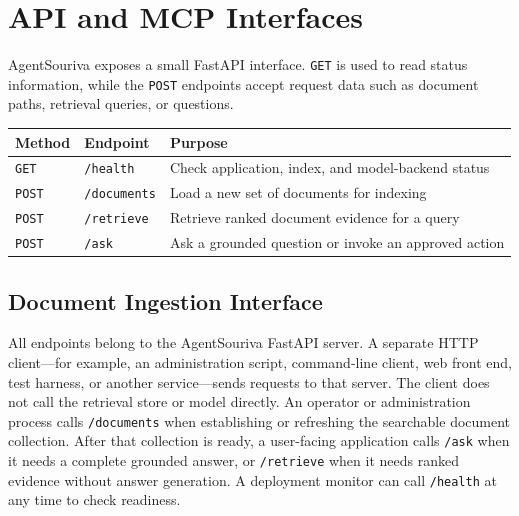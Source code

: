 
\section{API and MCP Interfaces}

AgentSouriva exposes a small FastAPI interface. \texttt{GET} is used to read status information, while the \texttt{POST} endpoints accept request data such as document paths, retrieval queries, or questions.

\begin{longtable}[]{@{}lll@{}}
\toprule\noalign{}
Method & Endpoint & Purpose \\
\midrule\noalign{}
\endhead
\bottomrule\noalign{}
\endlastfoot
\texttt{GET} & \texttt{/health} & Check application, index, and model-backend status \\
\texttt{POST} & \texttt{/documents} & Load a new set of documents for indexing \\
\texttt{POST} & \texttt{/retrieve} & Retrieve ranked document evidence for a query \\
\texttt{POST} & \texttt{/ask} & Ask a grounded question or invoke an approved action \\
\end{longtable}

\subsection{Document Ingestion Interface}


All endpoints belong to the AgentSouriva FastAPI server. A separate HTTP client---for example, an administration script, command-line client, web front end, test harness, or another service---sends requests to that server. The client does not call the retrieval store or model directly. An operator or administration process calls \texttt{/documents} when establishing or refreshing the searchable document collection. After that collection is ready, a user-facing application calls \texttt{/ask} when it needs a complete grounded answer, or \texttt{/retrieve} when it needs ranked evidence without answer generation. A deployment monitor can call \texttt{/health} at any time to check readiness.

